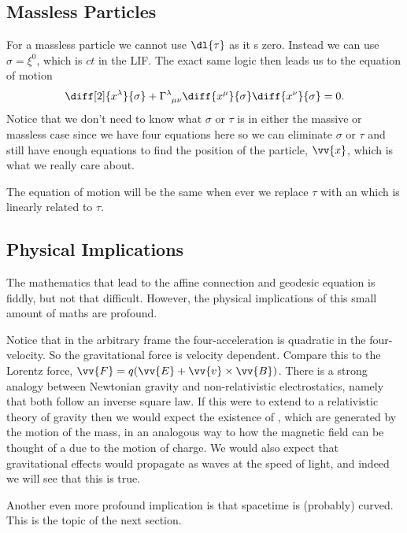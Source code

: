 \documentclass[fleqn]{NotesClass}
\newcommand*{\christoffel}[3]{\tensor{\Gamma}{^{#1}_{{#2}{#3}}}}
\begin{document}
    \subsection{Massless Particles}
    For a massless particle we cannot use \(\dl{\tau}\) as it s zero.
    Instead we can use \(\sigma = \xi^0\), which is \(ct\) in the LIF.
    The exact same logic then leads us to the equation of motion
    \begin{equation}
        \diff[2]{x^\lambda}{\sigma} + \christoffel{\lambda}{\mu}{\nu} \diff{x^\mu}{\sigma} \diff{x^\nu}{\sigma} = 0.
    \end{equation}
    Notice that we don't need to know what \(\sigma\) or \(\tau\) is in either the massive or massless case since we have four equations here so we can eliminate \(\sigma\) or \(\tau\) and still have enough equations to find the position of the particle, \(\vv{x}\), which is what we really care about.
    
    The equation of motion will be the same when ever we replace \(\tau\) with an  which is linearly related to \(\tau\).
    
    \subsection{Physical Implications}
    The mathematics that lead to the affine connection and geodesic equation is fiddly, but not that difficult.
    However, the physical implications of this small amount of maths are profound.
    
    Notice that in the arbitrary frame the four-acceleration is quadratic in the four-velocity.
    So the gravitational force is velocity dependent.
    Compare this to the Lorentz force, \(\vv{F} = q(\vv{E} + \vv{v} \times \vv{B})\).
    There is a strong analogy between Newtonian gravity and non-relativistic electrostatics, namely that both follow an inverse square law.
    If this were to extend to a relativistic theory of gravity then we would expect the existence of , which are generated by the motion of the mass, in an analogous way to how the magnetic field can be thought of a due to the motion of charge.
    We would also expect that gravitational effects would propagate as waves at the speed of light, and indeed we will see that this is true.
    
    Another even more profound implication is that spacetime is (probably) curved.
    This is the topic of the next section.
    
\end{document}
